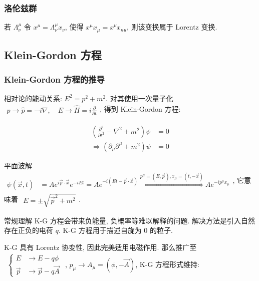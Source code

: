 \documentclass[../../main.tex]{subfiles}
\begin{document}
\subsubsection{洛伦兹群}

若 $\Lambda^{\mu}_{\nu}$ 令 $x^{\mu} = \Lambda^{\mu}_{\nu}x_{\nu}$, 使得 $x^{\mu}x_{\mu} = x^{\nu}x_{nu}$, 则该变换属于 Lorentz 变换. 

\subsection{Klein-Gordon 方程}
\subsubsection{Klein-Gordon 方程的推导}

相对论的能动关系: $E^{2} = p^{2} + m^{2}$. 对其使用一次量子化 $\begin{aligned}
    p\rightarrow \hat{p} = -i\nabla,\quad E\rightarrow \hat{H} = i\frac{\partial }{\partial t}
\end{aligned}$, 得到 Klein-Gordon 方程: 

\begin{align*}
    \left(\frac{\partial^{2}}{\partial t^{2}} - \nabla^{2} + m^{2}\right)\psi &= 0\\
    \Rightarrow \left(\partial_{\mu}\partial^{\mu} + m^{2}\right)\psi &= 0
\end{align*}

平面波解 $\begin{aligned}
    \psi(\vec{x},t) &= Ae^{i\vec{p}\cdot\vec{x}}e^{-iEt} = Ae^{-i(Et-\vec{p}\cdot\vec{x})}\stackrel{p^{\mu}=(E,\vec{p}),x_{\mu}=(t,-\vec{x})}{\Longrightarrow} Ae^{-ip^{\mu}x_{\mu}}
\end{aligned}$, 它意味着 $\begin{aligned}
    E = \pm\sqrt{\vec{p}^{2}+ m^{2}}
\end{aligned}$. 

常规理解 K-G 方程会带来负能量, 负概率等难以解释的问题. 解决方法是引入自然存在正负的电荷 $q$. K-G 方程用于描述自旋为 $0$ 的粒子. 

K-G 具有 Lorentz 协变性, 因此完美适用电磁作用. 那么推广至 $\begin{aligned}\begin{cases}
    E &\rightarrow E - q\phi\\
    \vec{p} &\rightarrow \vec{p} - q\vec{A}
\end{cases}
\end{aligned}$, 
$p_{\mu}\rightarrow A_{\mu} = (\phi,-\vec{A})$, K-G 方程形式维持:
\end{document}
